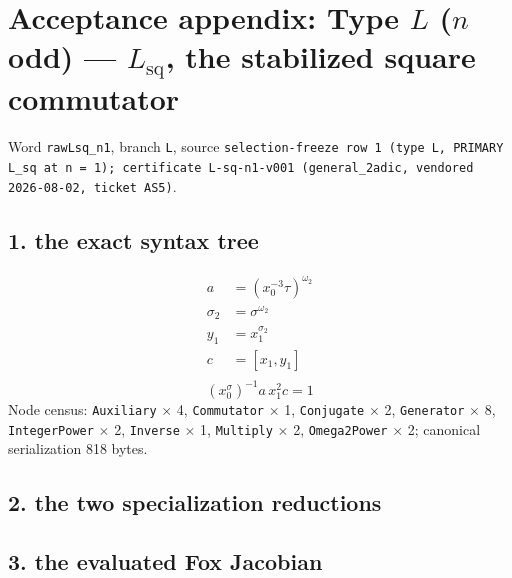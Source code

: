%

\section{Acceptance appendix: Type $L$ ($n$ odd) --- $L_{\mathrm{sq}}$, the stabilized square commutator}
\label{sec:appendix-L}

Word \texttt{rawLsq\_n1}, branch \texttt{L}, source \texttt{selection-freeze row 1 (type L, PRIMARY L\_sq at n = 1); certificate L-sq-n1-v001 (general\_2adic, vendored 2026-08-02, ticket AS5)}.

\subsection{1. the exact syntax tree}
\begin{align*}
  a &= (x_0^{-3}\tau)^{\omega_2}\\
  \sigma_2 &= \sigma^{\omega_2}\\
  y_1 &= x_1^{\sigma_2}\\
  c &= [x_1,y_1]\\
\end{align*}
\[ (x_0^\sigma)^{-1}a\,x_1^2c = 1 \]
Node census: \texttt{Auxiliary} $\times$ 4, \texttt{Commutator} $\times$ 1, \texttt{Conjugate} $\times$ 2, \texttt{Generator} $\times$ 8, \texttt{IntegerPower} $\times$ 2, \texttt{Inverse} $\times$ 1, \texttt{Multiply} $\times$ 2, \texttt{Omega2Power} $\times$ 2; canonical serialization 818 bytes.

\subsection{2. the two specialization reductions}

\subsection{3. the evaluated Fox Jacobian}

